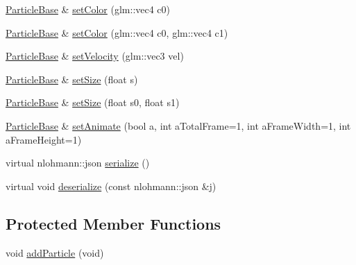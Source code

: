 \begin{DoxyCompactItemize}
\mbox{\hyperlink{class_beer_engine_1_1_component_1_1_particle_base}{Particle\+Base}} \& \mbox{\hyperlink{class_beer_engine_1_1_component_1_1_particle_base_a9217363eb47c65426dfbee8c03376043}{set\+Color}} (glm\+::vec4 c0)
\item 
\mbox{\hyperlink{class_beer_engine_1_1_component_1_1_particle_base}{Particle\+Base}} \& \mbox{\hyperlink{class_beer_engine_1_1_component_1_1_particle_base_a1d89c8ce8200884d73281f1b4a27ba9a}{set\+Color}} (glm\+::vec4 c0, glm\+::vec4 c1)
\item 
\mbox{\hyperlink{class_beer_engine_1_1_component_1_1_particle_base}{Particle\+Base}} \& \mbox{\hyperlink{class_beer_engine_1_1_component_1_1_particle_base_acb44169a66aca05b0095b6ae9992ff8e}{set\+Velocity}} (glm\+::vec3 vel)
\item 
\mbox{\hyperlink{class_beer_engine_1_1_component_1_1_particle_base}{Particle\+Base}} \& \mbox{\hyperlink{class_beer_engine_1_1_component_1_1_particle_base_a69899aa53162738931a1e3ef5b56fc79}{set\+Size}} (float s)
\item 
\mbox{\hyperlink{class_beer_engine_1_1_component_1_1_particle_base}{Particle\+Base}} \& \mbox{\hyperlink{class_beer_engine_1_1_component_1_1_particle_base_a8474f6429168a3695162b54259855e3c}{set\+Size}} (float s0, float s1)
\item 
\mbox{\hyperlink{class_beer_engine_1_1_component_1_1_particle_base}{Particle\+Base}} \& \mbox{\hyperlink{class_beer_engine_1_1_component_1_1_particle_base_adfa9cb8fefe1f3ffee2f67ac4bf2f7d3}{set\+Animate}} (bool a, int a\+Total\+Frame=1, int a\+Frame\+Width=1, int a\+Frame\+Height=1)
\item 
virtual nlohmann\+::json \mbox{\hyperlink{class_beer_engine_1_1_component_1_1_particle_base_ac4ab484a5ef468cbb69cccdf39e6d9a8}{serialize}} ()
\item 
virtual void \mbox{\hyperlink{class_beer_engine_1_1_component_1_1_particle_base_a227b7fe0edab6df4b6c15f4b22bed7ae}{deserialize}} (const nlohmann\+::json \&j)
\end{DoxyCompactItemize}
\subsection*{Protected Member Functions}
\begin{DoxyCompactItemize}
\item 
void \mbox{\hyperlink{class_beer_engine_1_1_component_1_1_particle_base_a6191ae1cb301a45bbf7414fedc5e1b05}{add\+Particle}} (void)
\end{DoxyCompactItemize}
